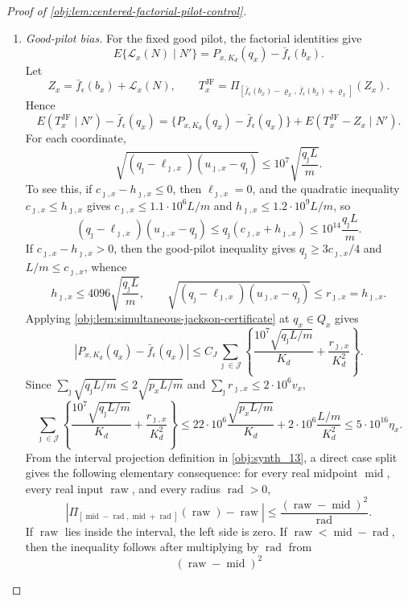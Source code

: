 \documentclass[11pt]{article}
\begin{document}
\begin{proof}[Proof of \cref{obj:lem:centered-factorial-pilot-control}]
\begin{enumerate}
\item \label{item:pf-good-pilot-bias}\emph{Good-pilot bias.}
For the fixed good pilot, the factorial identities give
\[
E\{\mathcal L_x(N)\mid N'\}
=
P_{x,K_d}(q_x)-\bar f_\epsilon(b_x).
\]
Let
\[
Z_x=\bar f_\epsilon(b_x)+\mathcal L_x(N),
\qquad
T_x^{\mathrm{JF}}
=
\Pi_{[\bar f_\epsilon(b_x)-\varrho_x,\,
       \bar f_\epsilon(b_x)+\varrho_x]}(Z_x).
\]
Hence
\[
E(T_x^{\mathrm{JF}}\mid N')-\bar f_\epsilon(q_x)
=
\{P_{x,K_d}(q_x)-\bar f_\epsilon(q_x)\}
+
E(T_x^{\mathrm{JF}}-Z_x\mid N').
\]
For each coordinate,
\[
\sqrt{(q_\jmath-\ell_{\jmath,x})(u_{\jmath,x}-q_\jmath)}
\le
10^7\sqrt{\frac{q_\jmath L}{m}} .
\]
To see this, if \(c_{\jmath,x}-h_{\jmath,x}\le0\), then
\(\ell_{\jmath,x}=0\), and the quadratic inequality
\(c_{\jmath,x}\le h_{\jmath,x}\) gives
\(c_{\jmath,x}\le1.1\cdot10^6L/m\) and
\(h_{\jmath,x}\le1.2\cdot10^9L/m\), so
\[
(q_\jmath-\ell_{\jmath,x})(u_{\jmath,x}-q_\jmath)
\le q_\jmath(c_{\jmath,x}+h_{\jmath,x})
\le 10^{14}\frac{q_\jmath L}{m}.
\]
If \(c_{\jmath,x}-h_{\jmath,x}>0\), then the good-pilot inequality gives
\(q_\jmath\ge3c_{\jmath,x}/4\) and \(L/m\le c_{\jmath,x}\), whence
\[
h_{\jmath,x}\le4096\sqrt{\frac{q_\jmath L}{m}},
\qquad
\sqrt{(q_\jmath-\ell_{\jmath,x})(u_{\jmath,x}-q_\jmath)}
\le r_{\jmath,x}=h_{\jmath,x}.
\]
Applying \cref{obj:lem:simultaneous-jackson-certificate} at \(q_x\in Q_x\) gives
\[
|P_{x,K_d}(q_x)-\bar f_\epsilon(q_x)|
\le
C_J
\sum_{\jmath\in\mathcal J}
\left\{
\frac{10^7\sqrt{q_\jmath L/m}}{K_d}
+
\frac{r_{\jmath,x}}{K_d^2}
\right\}.
\]
Since \(\sum_{\jmath}\sqrt{q_\jmath L/m}\le2\sqrt{p_xL/m}\) and
\(\sum_{\jmath}r_{\jmath,x}\le2\cdot10^6v_x\),
\[
\sum_{\jmath\in\mathcal J}
\left\{
\frac{10^7\sqrt{q_\jmath L/m}}{K_d}
+
\frac{r_{\jmath,x}}{K_d^2}
\right\}
\le
22\cdot10^6\frac{\sqrt{p_xL/m}}{K_d}
+
2\cdot10^6\frac{L/m}{K_d^2}
\le
5\cdot10^{16}\eta_x .
\]
From the interval projection definition in \cref{obj:synth_13}, a direct case split gives the following elementary consequence: for every real midpoint \(\operatorname{mid}\), every real input \(\operatorname{raw}\), and every radius \(\operatorname{rad}>0\),
\[
\left|
\Pi_{[\operatorname{mid}-\operatorname{rad},\operatorname{mid}+\operatorname{rad}]}
(\operatorname{raw})-\operatorname{raw}
\right|
\le
\frac{(\operatorname{raw}-\operatorname{mid})^2}{\operatorname{rad}}.
\]
If \(\operatorname{raw}\) lies inside the interval, the left side is zero.  If
\(\operatorname{raw}<\operatorname{mid}-\operatorname{rad}\), then the inequality follows after multiplying by \(\operatorname{rad}\) from
\[
(\operatorname{raw}-\operatorname{mid})^2
\]
\end{enumerate}
\end{proof}
\end{document}
